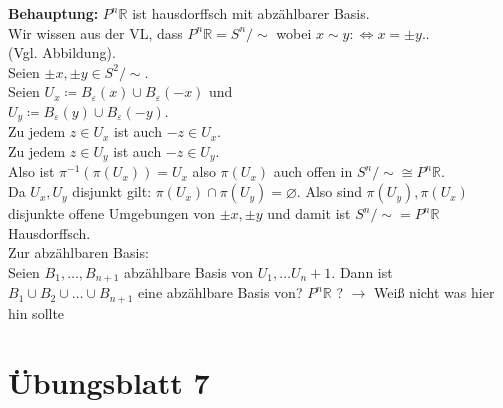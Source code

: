 \begin{problem*}[3b]
  \textbf{Behauptung:} \( P^n\mathbb{R} \) ist hausdorffsch mit abzählbarer Basis. \\
  Wir wissen aus der VL, dass \( P^n\mathbb{R} = S^n / \sim \) wobei \( x \sim y :\Leftrightarrow x = \pm y. \). \\
  (Vgl. Abbildung). \\
  Seien \( \pm x, \pm y \in S^2 / \sim \). \\
  Seien \( U_x \coloneqq B_\varepsilon(x) \cup B_\varepsilon(-x) \) und \\
  \( U_y \coloneqq B_\varepsilon(y) \cup B_\varepsilon(-y) \). \\
  Zu jedem \( z \in U_x \) ist auch \( -z \in U_x \). \\
  Zu jedem \( z \in U_y \) ist auch \( -z \in U_y \). \\
  Also ist \( \pi^{-1} (\pi(U_x)) = U_x \) also \( \pi(U_x) \) auch offen in \( S^n / \sim \cong P^n\mathbb{R} \). \\
  Da \( U_x, U_y \) disjunkt gilt: \( \pi(U_x) \cap \pi(U_y) = \varnothing \). Also sind \( \pi(U_y), \pi(U_x) \) disjunkte offene Umgebungen von \( \pm x, \pm y \) und damit ist \( S^n / \sim = P^n\mathbb{R} \) Hausdorffsch. \\
  Zur abzählbaren Basis: \\
  Seien \( B_1, \dots, B_{n+1} \) abzählbare Basis von \( U_1, \dots U_n+1 \). Dann ist \( B_1 \cup B_2 \cup \dots \cup B_{n+1} \) eine abzählbare Basis von? \( P^n\mathbb{R} \) \quad? \( \to \) Weiß nicht was hier hin sollte %
\end{problem*}



% 
\section{Übungsblatt 7}

